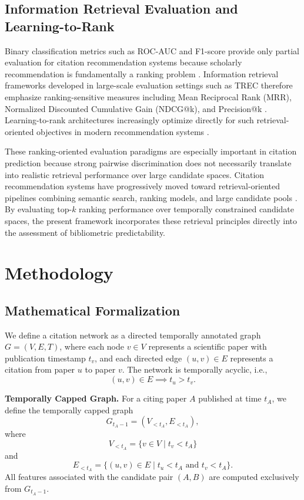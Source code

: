 \documentclass[11pt,a4paper]{article}
\begin{document}
\subsection{Information Retrieval Evaluation and Learning-to-Rank}

Binary classification metrics such as ROC-AUC and F1-score provide only partial evaluation for citation recommendation systems because scholarly recommendation is fundamentally a ranking problem \citep{manning2008introduction, powers2011evaluation}. Information retrieval frameworks developed in large-scale evaluation settings such as TREC \citep{voorhees2005trec} therefore emphasize ranking-sensitive measures including Mean Reciprocal Rank (MRR), Normalized Discounted Cumulative Gain (NDCG@k), and Precision@k \citep{jarvelin2002cumulated}. Learning-to-rank architectures increasingly optimize directly for such retrieval-oriented objectives in modern recommendation systems \citep{liu2009learning}.

These ranking-oriented evaluation paradigms are especially important in citation prediction because strong pairwise discrimination does not necessarily translate into realistic retrieval performance over large candidate spaces. Citation recommendation systems have progressively moved toward retrieval-oriented pipelines combining semantic search, ranking models, and large candidate pools \citep{beel2016paper}. By evaluating top-\(k\) ranking performance over temporally constrained candidate spaces, the present framework incorporates these retrieval principles directly into the assessment of bibliometric predictability.

\section{Methodology}
\label{sec:method}

\subsection{Mathematical Formalization}

We define a citation network as a directed temporally annotated graph \(G = (V,E,T)\), where each node \(v \in V\) represents a scientific paper with publication timestamp \(t_v\), and each directed edge \((u,v) \in E\) represents a citation from paper \(u\) to paper \(v\). The network is temporally acyclic, i.e.,
\[
(u,v) \in E \implies t_u > t_v.
\]

\textbf{Temporally Capped Graph.}
For a citing paper \(A\) published at time \(t_A\), we define the temporally capped graph
\[
G_{t_A-1} = (V_{<t_A}, E_{<t_A}),
\]
where
\[
V_{<t_A} = \{v \in V \mid t_v < t_A\}
\]
and
\[
E_{<t_A} = \{(u,v) \in E \mid t_u < t_A \text{ and } t_v < t_A\}.
\]
All features associated with the candidate pair \((A,B)\) are computed exclusively from \(G_{t_A-1}\).
\end{document}
